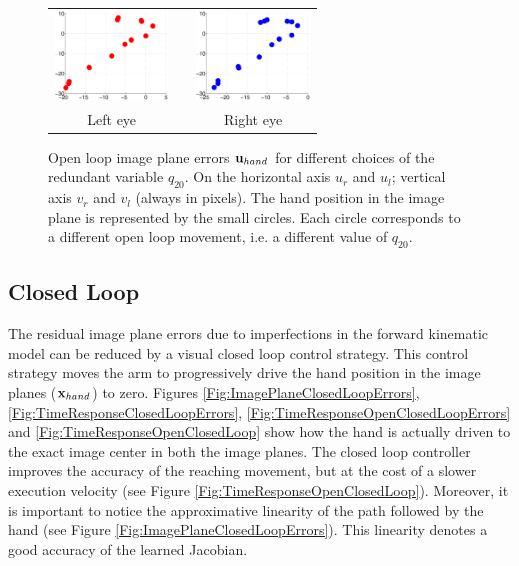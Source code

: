 \begin{figure}
  \begin{center}
	\begin{tabular}{ccc}
	  \parbox{30mm}{\includegraphics[width=30mm]{Figure/LeftEyeOpenLoop.eps}}  & \hspace{0.1cm} &
	  \parbox{30mm}{\includegraphics[width=30mm]{Figure/RightEyeOpenLoop.eps}}
	  \\
	  \parbox{30mm}{\centering Left eye } & \hspace{0.1cm} & \parbox{30mm}{\centering Right eye }
  \end{tabular}
\end{center}
\caption{Open loop image plane errors $\mathbf{u}_{hand}$ for different
choices of the redundant variable $q_{20}$. On the horizontal axis 
$u_r$ and $u_l$; vertical axis $v_r$ and $v_l$ (always in pixels).
The hand position in the image plane is represented 
by the small circles.  Each circle corresponds to a different open loop movement, i.e. a different value of $q_{20}$.
}\label{Fig:ImagePlaneOpenLoopErrors}
 \end{figure}

\subsection{Closed Loop}

The residual image plane errors 
due to imperfections in the forward kinematic model can be reduced by a visual closed loop
control strategy. This control strategy moves the arm to progressively 
drive the hand position in the image planes ($\mathbf{x}_{hand}$) to zero. Figures
\ref{Fig:ImagePlaneClosedLoopErrors}, \ref{Fig:TimeResponseClosedLoopErrors}, \ref{Fig:TimeResponseOpenClosedLoopErrors} and \ref{Fig:TimeResponseOpenClosedLoop}  
show how the hand is actually driven to the 
exact image center in both the image planes. The closed loop controller 
improves the accuracy of the reaching movement, but at the cost of a slower 
execution velocity (see Figure \ref{Fig:TimeResponseOpenClosedLoop}). 
Moreover, it is important to notice 
the approximative linearity of the path followed by the hand 
(see Figure \ref{Fig:ImagePlaneClosedLoopErrors}). This linearity denotes 
a good accuracy of the learned Jacobian.

